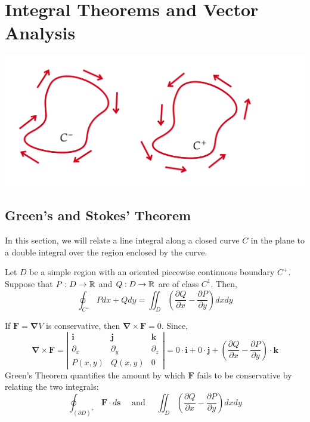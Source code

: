\section{Integral Theorems and Vector Analysis}
\begin{marginfigure}
	\begin{center}
	\includegraphics[width=\linewidth]{figures/wk-7/fig-1.png}
	\end{center}
\end{marginfigure}


\subsection{Green's and Stokes' Theorem}
In this section, we will relate a line integral along a closed curve $C$ in the plane to a double integral over the region enclosed by the curve. 

\begin{thm}
	Let $D$ be a simple region with an oriented piecewise continuous boundary $C^+$. Suppose that $P: D \rightarrow \mathbb{R}$ and $Q: D \rightarrow \mathbb{R}$ are of class $C^1$. Then,
	\[\oint_{C^+} P d x+Q d y=\iint_D\left(\frac{\partial Q}{\partial x}-\frac{\partial P}{\partial y}\right) d x d y\]
\end{thm}

\hfill

\begin{rmk}
	If $\mathbf{F} = \mathbf{\nabla} V$ is conservative, then $\mathbf{\nabla} \times \mathbf{F} = 0$. Since,
	\[
	\mathbf{\nabla} \times \mathbf{F}=\left|\begin{array}{ccc}
	\mathbf{i} & \mathbf{j} & \mathbf{k} \\
	\partial_x & \partial_y & \partial_z \\
	P(x, y) & Q(x, y) & 0
	\end{array}\right| = 0 \cdot \mathbf{i} + 0 \cdot \mathbf{j} + \left(\frac{\partial Q}{\partial x} - \frac{\partial P}{\partial y}\right) \cdot \mathbf{k}
	\]
	Green's Theorem quantifies the amount by which  $\mathbf{F}$ fails to be conservative by relating the two integrals:
	\[\oint_{{(\partial D)}^+} \mathbf{F} \cdot d \mathbf{s} \quad \text{ and } \quad \iint_D\left(\frac{\partial Q}{\partial x}-\frac{\partial P}{\partial y}\right) d x d y\]
\end{rmk}

